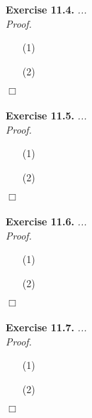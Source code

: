 \documentclass{article}
\begin{document}



\textbf{Exercise 11.4.}
\emph{...} \\

\emph{Proof.}
\begin{enumerate}
\item[(1)]
\item[(2)]

\end{enumerate}
$\Box$ \\\\






\textbf{Exercise 11.5.}
\emph{...} \\

\emph{Proof.}
\begin{enumerate}
\item[(1)]
\item[(2)]

\end{enumerate}
$\Box$ \\\\






\textbf{Exercise 11.6.}
\emph{...} \\

\emph{Proof.}
\begin{enumerate}
\item[(1)]
\item[(2)]

\end{enumerate}
$\Box$ \\\\






\textbf{Exercise 11.7.}
\emph{...} \\

\emph{Proof.}
\begin{enumerate}
\item[(1)]
\item[(2)]

\end{enumerate}
$\Box$ \\\\
\end{document}

